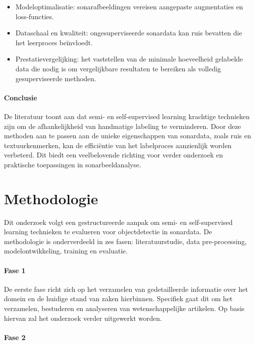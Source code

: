 \begin{itemize}
    \item Modeloptimalisatie: sonarafbeeldingen vereisen aangepaste augmentaties en loss-functies.
    \item Dataschaal en kwaliteit: ongesuperviseerde sonardata kan ruis bevatten die het leerproces beïnvloedt.
    \item Prestatievergelijking: het vaststellen van de minimale hoeveelheid gelabelde data die nodig is om vergelijkbare resultaten te bereiken als volledig gesuperviseerde methoden.
\end{itemize}

\paragraph{Conclusie}

De literatuur toont aan dat semi- en self-supervised learning krachtige technieken zijn om de afhankelijkheid van handmatige labeling te verminderen. Door deze methoden aan te passen aan de unieke eigenschappen van sonardata, zoals ruis en textuurkenmerken, kan de efficiëntie van het labelproces aanzienlijk worden verbeterd. Dit biedt een veelbelovende richting voor verder onderzoek en praktische toepassingen in sonarbeeldanalyse.

\section{Methodologie}%
\label{sec:methodologie}

Dit onderzoek volgt een gestructureerde aanpak om semi- en self-supervised learning technieken te evalueren voor objectdetectie in sonardata. De methodologie is onderverdeeld in zes fasen: literatuurstudie, data pre-processing, modelontwikkeling, training en evaluatie.

\paragraph{Fase 1}

De eerste fase richt zich op het verzamelen van gedetailleerde informatie over het domein en de huidige stand van zaken hierbinnen. Specifiek gaat dit om het verzamelen, bestuderen en analyseren van wetenschappelijke artikelen. Op basis hiervan zal het onderzoek verder uitgewerkt worden.

\paragraph{Fase 2}

